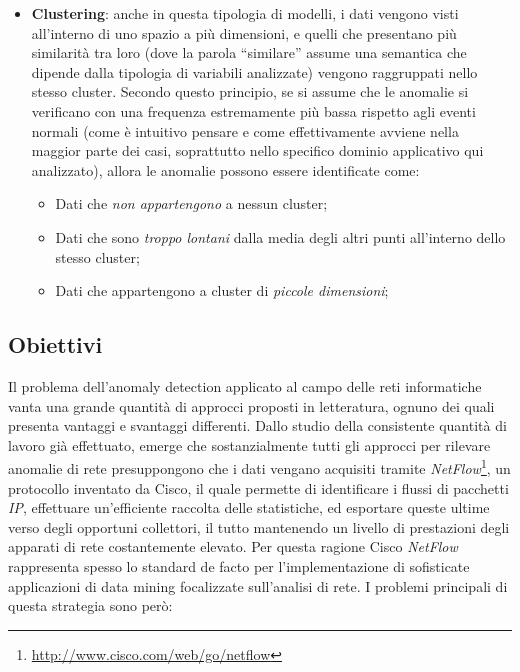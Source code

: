 \documentclass[12pt,a4paper,cucitura]{toptesi}
\begin{document}
\begin{itemize}
\item \textbf{Clustering}: anche in questa tipologia di modelli, i dati vengono visti all'interno di uno spazio a più dimensioni, e quelli che presentano più similarità tra loro (dove la parola ``similare'' assume una semantica che dipende dalla tipologia di variabili analizzate) vengono raggruppati nello stesso cluster. Secondo questo principio, se si assume che le anomalie si verificano con una frequenza estremamente più bassa rispetto agli eventi normali (come è intuitivo pensare e come effettivamente avviene nella maggior parte dei casi, soprattutto nello specifico dominio applicativo qui analizzato), allora le anomalie possono essere identificate come:
\begin{itemize}
\item Dati che \emph{non appartengono} a nessun cluster;
\item Dati che sono \emph{troppo lontani} dalla media degli altri punti all'interno dello stesso cluster;
\item Dati che appartengono a cluster di \emph{piccole dimensioni};
\end{itemize}
\end{itemize}

\subsection{Obiettivi}

Il problema dell'anomaly detection applicato al campo delle reti informatiche vanta una grande quantità di approcci proposti in letteratura, ognuno dei quali presenta vantaggi e svantaggi differenti.
Dallo studio della consistente quantità di lavoro già effettuato, emerge che sostanzialmente tutti gli approcci per rilevare anomalie di rete presuppongono che i dati vengano acquisiti tramite \emph{NetFlow}\footnote{\url{http://www.cisco.com/web/go/netflow}}, un protocollo inventato da Cisco, il quale permette di identificare i flussi di pacchetti \emph{IP}, effettuare un'efficiente raccolta delle statistiche, ed esportare queste ultime verso degli opportuni collettori, il tutto mantenendo un livello di prestazioni degli apparati di rete costantemente elevato.
Per questa ragione Cisco \emph{NetFlow} rappresenta spesso lo standard de facto per l'implementazione di sofisticate applicazioni di data mining focalizzate sull'analisi di rete.
I problemi principali di questa strategia sono però:
\end{document}
